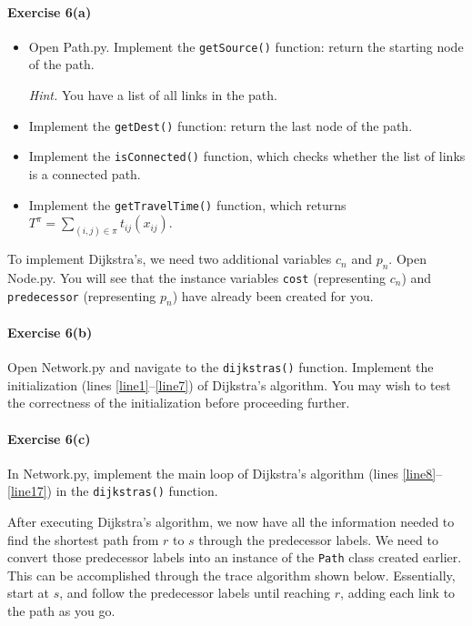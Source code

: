 \documentclass[11pt]{article}
\begin{document}
\paragraph*{Exercise 6(a)} 
\begin{itemize}
	\item Open Path.py. Implement the \texttt{getSource()} function: return the starting node of the path.
	
	\textit{Hint.} You have a list of all links in the path.
	
	\item Implement the \texttt{getDest()} function: return the last node of the path.
	\item Implement the \texttt{isConnected()} function, which checks whether the list of links is a connected path.
	\item Implement the \texttt{getTravelTime()} function, which returns $T^\pi = \sum_{(i,j)\in\pi} t_{ij}(x_{ij})$.
\end{itemize}



\vspace{\baselineskip}

\noindent
To implement Dijkstra's, we need two additional variables $c_n$ and $p_n$.
Open Node.py. You will see that the instance variables \texttt{cost} (representing $c_n$) and \texttt{predecessor} (representing $p_n$) have already been created for you.


\paragraph*{Exercise 6(b)} Open Network.py and navigate to the \texttt{dijkstras()} function. Implement the initialization (lines \ref{line1}--\ref{line7}) of Dijkstra's algorithm. 
You may wish to test the correctness of the initialization before proceeding further. 


\paragraph*{Exercise 6(c)} In Network.py, implement the main loop of Dijkstra's algorithm (lines \ref{line8}--\ref{line17}) in the \texttt{dijkstras()} function. 

\vspace{\baselineskip}

\noindent
After executing Dijkstra's algorithm, we now have all the information needed to find the shortest path from $r$ to $s$ through the predecessor labels. We need to convert those predecessor labels into an instance of the \texttt{Path} class created earlier. This can be accomplished through the trace algorithm shown below. Essentially, start at $s$, and follow the predecessor labels until reaching $r$, adding each link to the path as you go. 
\end{document}
